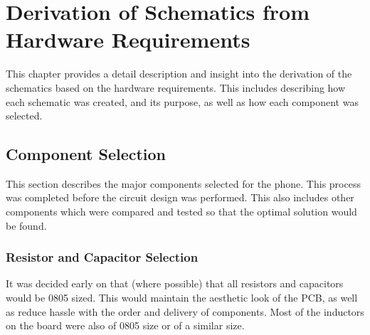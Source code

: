 
\chapter{Derivation of Schematics from Hardware Requirements} %

\label{Chapter5} %

This chapter provides a detail description and insight into the derivation of the schematics based on the hardware requirements. 
This includes describing how each schematic was created, and its purpose, as well as how each component was selected.


\section{Component Selection} 
	
	This section describes the major components selected for the phone. 
This process was completed before the circuit design was performed. 
This also includes other components which were compared and tested so that the optimal solution would be found. 


\subsection{Resistor and Capacitor Selection}

It was decided early on that (where possible) that all resistors and capacitors would be 0805 sized. 
This would maintain the aesthetic look of the PCB, as well as reduce hassle with the order and delivery of components. 
Most of the inductors on the board were also of 0805 size or of a similar size. 


